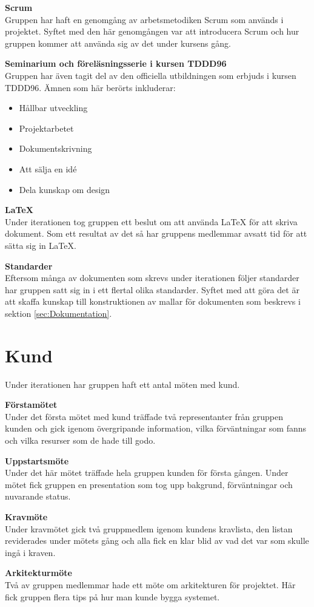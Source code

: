 \documentclass[a4paper,10pt]{article}
\begin{document}
\textbf{Scrum}\\ Gruppen har haft en genomgång av arbetsmetodiken Scrum som används i projektet. Syftet med den här genomgången var att introducera Scrum och hur gruppen kommer att använda sig av det under kursens gång.

\textbf{Seminarium och föreläsningsserie i kursen TDDD96}\\ Gruppen har även tagit del av den officiella utbildningen som erbjuds i kursen TDDD96. Ämnen som här berörts inkluderar:
\begin{itemize}
    \item Hållbar utveckling
    \item Projektarbetet
    \item Dokumentskrivning
    \item Att sälja en idé
    \item Dela kunskap om design
\end{itemize}

\textbf{\LaTeX}\\ Under iterationen tog gruppen ett beslut om att använda LaTeX för att skriva dokument. Som ett resultat av det så har gruppens medlemmar avsatt tid för att sätta sig in LaTeX.

\textbf{Standarder}\\ Eftersom många av dokumenten som skrevs under iterationen följer standarder har gruppen satt sig in i ett flertal olika standarder. Syftet med att göra det är att skaffa kunskap till konstruktionen av mallar för dokumenten som beskrevs i sektion \ref{sec:Dokumentation}.

\section{Kund}
Under iterationen har gruppen haft ett antal möten med kund.

\textbf{Förstamötet}\\
Under det första mötet med kund träffade två representanter från gruppen kunden och gick igenom övergripande information, vilka förväntningar som fanns och vilka resurser som de hade till godo.

\textbf{Uppstartsmöte}\\
Under det här mötet träffade hela gruppen kunden för första gången. Under mötet fick gruppen en presentation som tog upp bakgrund, förväntningar och nuvarande status.

\textbf{Kravmöte}\\
Under kravmötet gick två gruppmedlem igenom kundens kravlista, den listan reviderades under mötets gång och alla fick en klar blid av vad det var som skulle ingå i kraven.

\textbf{Arkitekturmöte}\\
Två av gruppen medlemmar hade ett möte om arkitekturen för projektet. Här fick gruppen flera tips på hur man kunde bygga systemet.
\end{document}
